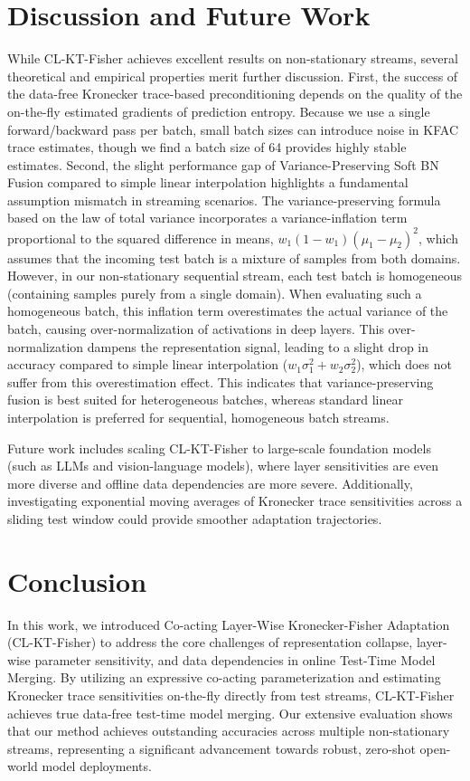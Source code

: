 \documentclass{article}
\theoremstyle{plain}
\theoremstyle{definition}
\theoremstyle{remark}
\begin{document}
\section{Discussion and Future Work}
\label{sec:discussion}
While CL-KT-Fisher achieves excellent results on non-stationary streams, several theoretical and empirical properties merit further discussion. First, the success of the data-free Kronecker trace-based preconditioning depends on the quality of the on-the-fly estimated gradients of prediction entropy. Because we use a single forward/backward pass per batch, small batch sizes can introduce noise in KFAC trace estimates, though we find a batch size of 64 provides highly stable estimates. Second, the slight performance gap of Variance-Preserving Soft BN Fusion compared to simple linear interpolation highlights a fundamental assumption mismatch in streaming scenarios. The variance-preserving formula based on the law of total variance incorporates a variance-inflation term proportional to the squared difference in means, $w_1(1-w_1)(\mu_1-\mu_2)^2$, which assumes that the incoming test batch is a mixture of samples from both domains. However, in our non-stationary sequential stream, each test batch is homogeneous (containing samples purely from a single domain). When evaluating such a homogeneous batch, this inflation term overestimates the actual variance of the batch, causing over-normalization of activations in deep layers. This over-normalization dampens the representation signal, leading to a slight drop in accuracy compared to simple linear interpolation ($w_1\sigma_1^2 + w_2\sigma_2^2$), which does not suffer from this overestimation effect. This indicates that variance-preserving fusion is best suited for heterogeneous batches, whereas standard linear interpolation is preferred for sequential, homogeneous batch streams.

Future work includes scaling CL-KT-Fisher to large-scale foundation models (such as LLMs and vision-language models), where layer sensitivities are even more diverse and offline data dependencies are more severe. Additionally, investigating exponential moving averages of Kronecker trace sensitivities across a sliding test window could provide smoother adaptation trajectories.

\section{Conclusion}
\label{sec:conclusion}
In this work, we introduced Co-acting Layer-Wise Kronecker-Fisher Adaptation (CL-KT-Fisher) to address the core challenges of representation collapse, layer-wise parameter sensitivity, and data dependencies in online Test-Time Model Merging. By utilizing an expressive co-acting parameterization and estimating Kronecker trace sensitivities on-the-fly directly from test streams, CL-KT-Fisher achieves true data-free test-time model merging. Our extensive evaluation shows that our method achieves outstanding accuracies across multiple non-stationary streams, representing a significant advancement towards robust, zero-shot open-world model deployments.
\end{document}
